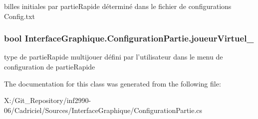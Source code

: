 billes initiales par partie\-Rapide déterminé dans le fichier de configurations Config.\-txt 

\hypertarget{class_interface_graphique_1_1_configuration_partie_a166c6a679593d7f6ceb8d6ed4a7a3eff}{
\subsubsection[{joueur\-Virtuel\-\_\-}]{\setlength{\rightskip}{0pt plus 5cm}bool Interface\-Graphique.\-Configuration\-Partie.\-joueur\-Virtuel\-\_\-}}\label{class_interface_graphique_1_1_configuration_partie_a166c6a679593d7f6ceb8d6ed4a7a3eff}


type de partie\-Rapide multijouer défini par l'utilisateur dans le menu de configuration de partie\-Rapide 



The documentation for this class was generated from the following file\-:\begin{DoxyCompactItemize}
\item 
X\-:/\-Git\-\_\-\-Repository/inf2990-\/06/\-Cadriciel/\-Sources/\-Interface\-Graphique/Configuration\-Partie.\-cs\end{DoxyCompactItemize}
